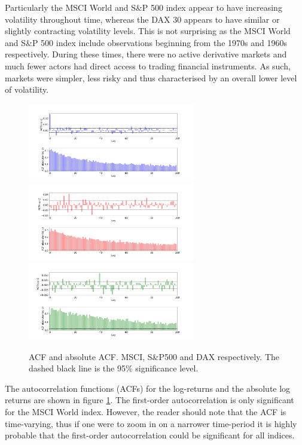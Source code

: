 Particularly the MSCI World and S\&P 500 index appear to have increasing volatility throughout time, whereas the DAX 30 appears to have similar or slightly contracting volatility levels. This is not surprising as the MSCI World and S\&P 500 index include observations beginning from the 1970s and 1960s respectively. During these times, there were no active derivative markets and much fewer actors had direct access to trading financial instruments. As such, markets were simpler, less risky and thus characterised by an overall lower level of volatility. 

\begin{figure}[H] 
    \centering
    \includegraphics[width=0.65\textwidth]{analysis/data_description/images/MSCI_ACF.png}
    \includegraphics[width=0.65\textwidth]{analysis/data_description/images/SP500_ACF.png}
    \includegraphics[width=0.65\textwidth]{analysis/data_description/images/DAX_ACF.png}
    \caption{ACF and absolute ACF. MSCI, S\&P500 and DAX respectively. The dashed black line is the 95\% significance level.}
    \label{fig: ACF_all_log_returns}
\end{figure}

The autocorrelation functions (ACFs) for the log-returns and the absolute log returns are shown in figure \ref{fig: ACF_all_log_returns}. The first-order autocorrelation is only significant for the MSCI World index. However, the reader should note that the ACF is time-varying, thus if one were to zoom in on a narrower time-period it is highly probable that the first-order autocorrelation could be significant for all indices. 

